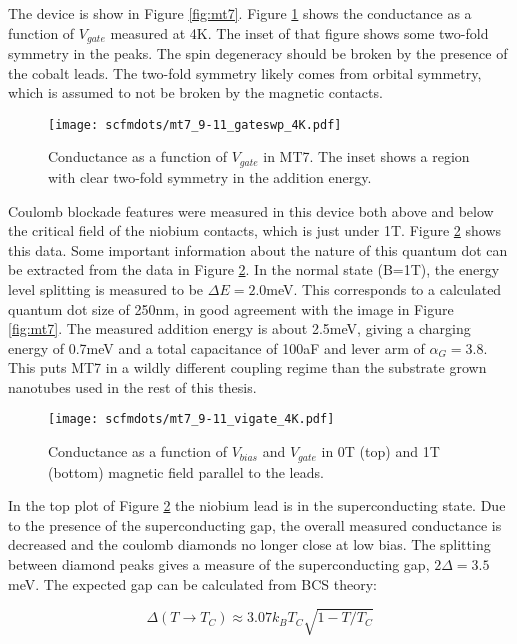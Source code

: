 The device is show in Figure \ref{fig:mt7}. Figure \ref{fig:mt7_gate} shows the conductance as a function of $V_{gate}$ measured at 4K. The inset of that figure shows some two-fold symmetry in the peaks. The spin degeneracy should be broken by the presence of the cobalt leads. The two-fold symmetry likely comes from orbital symmetry, which is assumed to not be broken by the magnetic contacts. 

\begin{figure}
    \centering
    \texttt{[image: scfmdots/mt7\_9-11\_gateswp\_4K.pdf]}
    \caption{Conductance as a function of $V_{gate}$ in MT7. The inset shows a region with clear two-fold symmetry in the addition energy.}
    \label{fig:mt7_gate}
\end{figure}

Coulomb blockade features were measured in this device both above and below the critical field of the niobium contacts, which is just under 1T. Figure \ref{fig:mt7_coulomb} shows this data. Some important information about the nature of this quantum dot can be extracted from the data in Figure \ref{fig:mt7_coulomb}. In the normal state (B=1T), the energy level splitting is measured to be $\Delta E  = 2.0$meV. This corresponds to a calculated quantum dot size of 250nm, in good agreement with the image in Figure \ref{fig:mt7}. The measured addition energy is about 2.5meV, giving a charging energy of 0.7meV and a total capacitance of 100aF and lever arm of $\alpha_G = 3.8$. This puts MT7 in a wildly different coupling regime than the substrate grown nanotubes used in the rest of this thesis.

\begin{figure}
    \centering
    \texttt{[image: scfmdots/mt7\_9-11\_vigate\_4K.pdf]}
    \caption{Conductance as a function of $V_{bias}$ and $V_{gate}$ in 0T (top) and 1T (bottom) magnetic field parallel to the leads.}
    \label{fig:mt7_coulomb}
\end{figure}

In the top plot of Figure \ref{fig:mt7_coulomb} the niobium lead is in the superconducting state. Due to the presence of the superconducting gap, the overall measured conductance is decreased and the coulomb diamonds no longer close at low bias. The splitting between diamond peaks gives a measure of the superconducting gap, $2\Delta = 3.5$meV. The expected gap can be calculated from BCS theory:

\begin{equation}
    \label{eq:bcs_gap}
    \Delta (T \rightarrow T_C) \approx 3.07 k_B T_C \sqrt{1 - T/T_C}
\end{equation}

